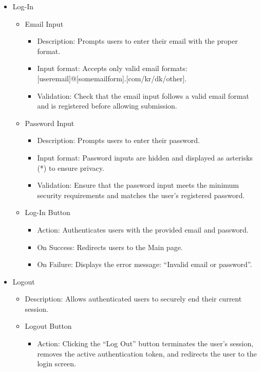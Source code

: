 \documentclass[conference]{IEEEtran}
\begin{document}
\begin{itemize}
    \item Log-In
    \begin{itemize}
        \item Email Input
        \begin{itemize}
            \item Description: Prompts users to enter their email with the proper format.
            \item Input format: Accepts only valid email formats: [useremail]@[somemailform].[com/kr/dk/other].
            \item Validation: Check that the email input follows a valid email format and is registered before allowing submission.
        \end{itemize}
        \item Password Input
        \begin{itemize}
            \item Description: Prompts users to enter their password.
            \item Input format: Password inputs are hidden and displayed as asterisks (*) to ensure privacy.
            \item Validation: Ensure that the password input meets the minimum security requirements and matches the user's registered password.
        \end{itemize}
        \item Log-In Button
        \begin{itemize}
            \item Action: Authenticates users with the provided email and password.
            \item On Success: Redirects users to the Main page.
            \item On Failure: Displays the error message: ``Invalid email or password''.
        \end{itemize}
    \end{itemize}

    \item Logout
    \begin{itemize}
        \item Description: Allows authenticated users to securely end their current session.
        \item Logout Button
        \begin{itemize}
            \item Action: Clicking the ``Log Out'' button terminates the user's session, removes the active authentication token, and redirects the user to the login screen.
        \end{itemize}
    \end{itemize}


\end{itemize}
\end{document}
